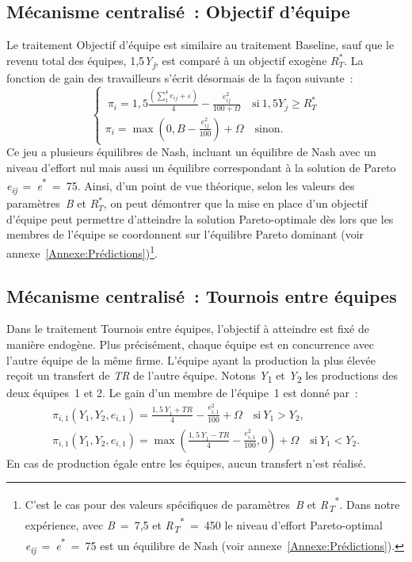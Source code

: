 \begin{Article}
\begin{refsection}[Lebourges]
\subsection{Mécanisme centralisé~: Objectif d'équipe}

Le traitement Objectif d'équipe est similaire au traitement Baseline,
sauf que le revenu total des équipes, 1,5\emph{Y\textsubscript{j}}, est
comparé à un objectif exogène \(R_{T}^{*}\). La fonction de gain des
travailleurs s'écrit désormais de la façon suivante~:
\begin{equation}
    \left\{ \begin{array}{r}
{\ \pi}_{i} = 1,5\frac{\left( \sum_{1}^{4}e_{ij} + \varepsilon \right)}{4} - \frac{e_{ij}^{2}}{100 + \Omega} \quad \text{si}\ 1,5Y_{j} \geq R_{T}^{*} \\
\pi_{i} = \max\left( 0,B - \frac{e_{ij}^{2}}{100} \right) + \Omega\quad \text{sinon.}
\end{array} \right.
\end{equation}
Ce jeu a plusieurs équilibres de Nash, incluant un équilibre de Nash
avec un niveau d'effort nul mais aussi un équilibre correspondant à la
solution de Pareto
\emph{e\textsubscript{ij}}~=~\emph{e}\textsuperscript{*}~=~75. Ainsi,
d'un point de vue théorique, selon les valeurs des paramètres~\emph{B}
et \(R_{T}^{*}\), on peut démontrer que la mise en place d'un objectif
d'équipe peut permettre d'atteindre la solution Pareto-optimale dès lors
que les membres de l'équipe se coordonnent sur l'équilibre Pareto
dominant (voir annexe~\ref{Annexe:Prédictions})\footnote{C'est le cas pour des valeurs
  spécifiques de paramètres~\emph{B}
  et {\emph{R}\textsubscript{\emph{T}}\textsuperscript{*}}. Dans notre expérience, avec \emph{B}~=~7,5 et {\emph{R}\textsubscript{\emph{T}}\textsuperscript{*}~=~450} le niveau d'effort Pareto-optimal \emph{e\textsubscript{ij}}~=~\emph{e}\textsuperscript{*}~=~75 est un équilibre de Nash (voir annexe~\ref{Annexe:Prédictions}).}.

\subsection{Mécanisme centralisé~: Tournois entre équipes}

Dans le traitement Tournois entre équipes, l'objectif à atteindre est
fixé de manière endogène. Plus précisément, chaque équipe est en
concurrence avec l'autre équipe de la même firme. L'équipe ayant la
production la plus élevée reçoit un transfert de \emph{TR} de l'autre
équipe. Notons \emph{Y}\textsubscript{1} et \emph{Y}\textsubscript{2}
les productions des deux équipes~1 et 2. Le gain d'un membre de
l'équipe~1 est donné par~:
\begin{gather}
\pi_{i,1}\left( Y_{1},Y_{2},e_{i,1} \right) = \frac{{1,5\ Y}_{1} + TR}{4} - \frac{e_{i,1}^{2}}{100} + \Omega \quad \text{si}\ Y_{1} > Y_{2}, \nonumber \\
\pi_{i,1}\left( Y_{1},Y_{2},e_{i,1} \right) = \max\left( \frac{{1,5\ Y}_{1} - TR}{4} - \frac{e_{i,1}^{2}}{100},0 \right) + \Omega \quad \text{si}\ Y_{1} < Y_{2}.
\end{gather}
En cas de production égale entre les équipes, aucun transfert n'est
réalisé.


\end{refsection}
\end{Article}
